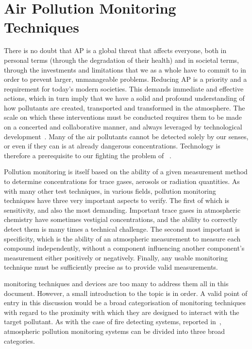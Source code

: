 
\section{Air Pollution Monitoring Techniques}%
\label{sec:litrev_air_pollution_measurement_techniques}

There is no doubt that \gls{AP} is a global threat that affects
everyone, both in personal terms (through the degradation of their
health) and in societal terms, through the investments and limitations
that we as a whole have to commit to in order to prevent larger,
unmanageable problems. Reducing \gls{AP} is a priority and a requirement
for today's modern societies. This demands immediate and effective
actions, which in turn imply that we have a solid and profound
understanding of how pollutants are created, transported and transformed
in the atmosphere. The scale on which these interventions must be
conducted requires them to be made on a concerted and collaborative
manner, and always leveraged by technological
development~\cite{EEA2019}. Many of the air pollutants cannot be
detected solely by our senses, or even if they can is at already
dangerous concentrations. Technology is therefore a prerequisite to our
fighting the problem of ~\cite{Vallero2014}.

Pollution monitoring is itself based on the ability of a given
measurement method to determine concentrations for trace gases, aerosols
or radiation quantities. As with many other test techniques, in various
fields, pollution monitoring techniques have three very important
aspects to verify. The first of which is sensitivity, and also the most
demanding. Important trace gases in atmospheric chemistry have sometimes
vestigial concentrations, and the ability to correctly detect them is
many times a technical challenge. The second most important is
specificity, which is the ability of an atmospheric measurement to
measure each compound independently, without a component influencing
another component's measurement either positively or negatively.
Finally, any usable monitoring technique must be sufficiently precise as
to provide valid measurements.

 monitoring techniques and devices are too many to address
them all in this document. However, a small introduction to the topic is
in order. A valid point of entry in this discussion would be a broad
categorisation of monitoring techniques with regard to the proximity
with which they are designed to interact with the target pollutant.
As with the case of fire detecting systems, reported
in~\cite{ValentedeAlmeida2017}, atmospheric pollution monitoring systems
can be divided into three broad categories.

